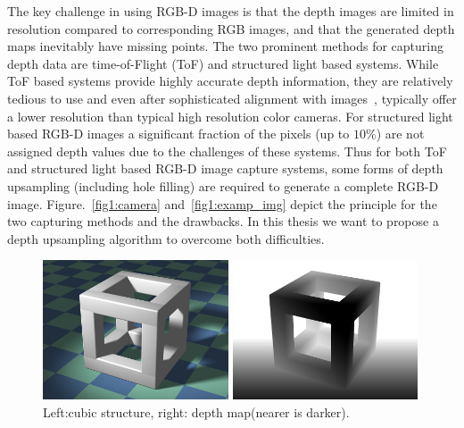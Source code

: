 The key challenge in using RGB-D images is that the depth images are limited in resolution compared to corresponding RGB images, and that the generated depth maps inevitably have missing points. The two prominent methods for capturing depth data are time-of-Flight (ToF) and structured light based systems. While ToF based systems provide highly accurate depth information, they are relatively tedious to use and even after sophisticated alignment with  images~\cite{Ding:FuseLidarSFM:ICASSP17}, typically offer a lower resolution than typical high resolution color cameras. For structured light based RGB-D images a significant fraction of the pixels (up to $10\%$) are not assigned depth values due to the challenges of these systems. Thus for both ToF and structured light based RGB-D image capture systems, some forms of depth upsampling (including hole filling) are required to generate a complete RGB-D image. Figure.~\ref{fig1:camera} and~\ref{fig1:examp_img} depict the principle for the two capturing methods and the drawbacks. In this thesis we want to propose a depth upsampling algorithm to overcome both difficulties.
\begin{figure}[htb]
\begin{minipage}[b]{0.45\linewidth}
  \centering
  \centerline{\includegraphics[width=5.5cm]{depth_interp/misc/800px-Cubic_Structure.jpg}}
\end{minipage}
\hfill
\begin{minipage}[b]{0.45\linewidth}
  \centering
  \centerline{\includegraphics[width=5.5cm]{depth_interp/misc/800px-Cubic_Frame_Stucture_and_Floor_Depth_Map.jpg}}
\end{minipage}
\vfill
\caption{ Left:cubic structure, right: depth map(nearer is darker).}
\label{fig1:def_rgbd}
\end{figure}

